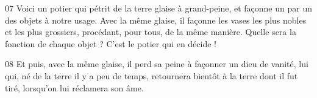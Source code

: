 
07 Voici un potier qui pétrit de la terre glaise à grand-peine, et façonne un par un des objets à notre usage. Avec la même glaise, il façonne les vases les plus nobles et les plus grossiers, procédant, pour tous, de la même manière. Quelle sera la fonction de chaque objet ? C’est le potier qui en décide !

08 Et puis, avec la même glaise, il perd sa peine à façonner un dieu de vanité, lui qui, né de la terre il y a peu de temps, retournera bientôt à la terre dont il fut tiré, lorsqu’on lui réclamera son âme.